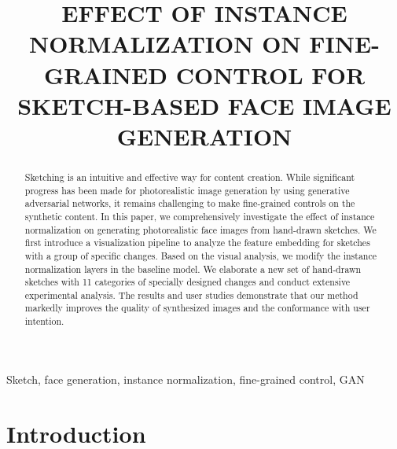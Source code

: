 \documentclass{article}
\title{EFFECT OF INSTANCE NORMALIZATION ON FINE-GRAINED CONTROL FOR SKETCH-BASED FACE IMAGE GENERATION}
\begin{document}
%
\maketitle
%
\begin{abstract}
Sketching is an intuitive and effective way for content creation. While significant progress has been made for photorealistic image generation by using generative adversarial networks, it remains challenging to make fine-grained controls on the synthetic content. 
In this paper, we comprehensively investigate the effect of instance normalization on generating photorealistic face images from hand-drawn sketches.
We first introduce a visualization pipeline to analyze the feature embedding for sketches with a group of specific changes.  
Based on the visual analysis, we modify the instance normalization layers in the baseline model. 
We elaborate a new set of hand-drawn sketches with 11 categories of specially designed changes and conduct extensive experimental analysis.  The results and user studies demonstrate that our method markedly improves the quality of synthesized images and the conformance with user intention.

\end{abstract}
%
\begin{keywords}
Sketch, face generation, instance normalization, fine-grained control, GAN
\end{keywords}
%
\section{Introduction}
\label{sec:intro}
\end{document}
